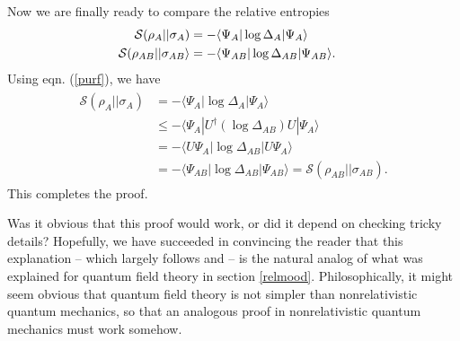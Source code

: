 \documentclass[12pt]{article}
\def\ra{\rangle}
\def\la{\langle}
\def\S{{\mathcal S}}
\numberwithin{equation}{section}
\begin{document}
Now we are finally ready to compare the relative entropies
\begin{align}\label{urf}  \S(\rho_A||\sigma_A) &=-\la \Psi_A|\log\Delta_A|\Psi_A\ra \cr 
                                  \S(\rho_{AB}||\sigma_{AB}\ra&=-\la \Psi_{AB}|\log\Delta_{AB}|\Psi_{AB}\ra. \end{align}
Using eqn. (\ref{purf}),
we have
\begin{align}
\begin{split}
\label{happy}\S(\rho_A||\sigma_A)&=-\la\Psi_A|\log \Delta_A|\Psi_A\ra \\
&\leq -\la \Psi_A|U^\dagger (\log \Delta_{AB} )U|\Psi_A\ra
\\ &=-\la U\Psi_A|\log\Delta_{AB}|U\Psi_A\ra \\
&= -\la\Psi_{AB}|\log\Delta_{AB}|\Psi_{AB}\ra= \S(\rho_{AB}||\sigma_{AB}). 
\end{split}\end{align}
This completes the proof.

Was it obvious that this proof would work, or did it depend on checking tricky details?   Hopefully, we have succeeded in convincing
the reader that this explanation -- which largely follows \cite{Petz} and \cite{PetzNielsen} -- is the natural analog
of what was explained for quantum field theory in section \ref{relmood}.  Philosophically, it might seem obvious that quantum field
theory is not simpler than nonrelativistic quantum mechanics, so that an analogous proof in nonrelativistic quantum mechanics
must work somehow.
\end{document}
